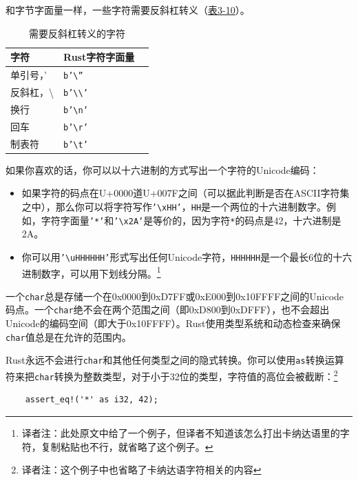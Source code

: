 和字节字面量一样，一些字符需要反斜杠转义（\hyperref[t3-10]{表3-10}）。
\begin{table}[htbp]
    \centering
    \caption{需要反斜杠转义的字符}
    \label{t3-10}
    \begin{tabular}{lll}
        \hline
        \textbf{字符}   &   \textbf{Rust字符字面量} \\
        \hline
        单引号，'   &   \texttt{b'\textbackslash''} \\
        \rowcolor{tablecolor}
        反斜杠，\textbackslash &    \texttt{b'\textbackslash\textbackslash'} \\
        换行        &    \texttt{b'\textbackslash n'} \\
        \rowcolor{tablecolor}
        回车        &   \texttt{b'\textbackslash r'} \\
        制表符      &   \texttt{b'\textbackslash t'} \\
    \end{tabular}
\end{table}

如果你喜欢的话，你可以以十六进制的方式写出一个字符的Unicode编码：
\begin{itemize}
    \item 如果字符的码点在U+0000道U+007F之间（可以据此判断是否在ASCII字符集之中），那么你可以将字符写作\texttt{'\textbackslash xHH'}，\texttt{HH}是一个两位的十六进制数字。例如，字符字面量\texttt{'*'}和\texttt{'\textbackslash x2A'}是等价的，因为字符\texttt{*}的码点是42，十六进制是2A。
    \item 你可以用\texttt{'\textbackslash u{HHHHHH}'}形式写出任何Unicode字符，\texttt{HHHHHH}是一个最长6位的十六进制数字，可以用下划线分隔。\footnote{译者注：此处原文中给了一个例子，但译者不知道该怎么打出卡纳达语里的字符，复制粘贴也不行，就省略了这个例子。}
\end{itemize}

一个\texttt{char}总是存储一个在0x0000到0xD7FF或0xE000到0x10FFFF之间的Unicode码点。一个\texttt{char}绝不会在两个范围之间（即0xD800到0xDFFF），也不会超出Unicode的编码空间（即大于0x10FFFF）。Rust使用类型系统和动态检查来确保\texttt{char}值总是在允许的范围内。

Rust永远不会进行\texttt{char}和其他任何类型之间的隐式转换。你可以使用\texttt{as}转换运算符来把\texttt{char}转换为整数类型，对于小于32位的类型，字符值的高位会被截断：\footnote{译者注：这个例子中也省略了卡纳达语字符相关的内容}
\begin{verbatim}
    assert_eq!('*' as i32, 42);
\end{verbatim}

